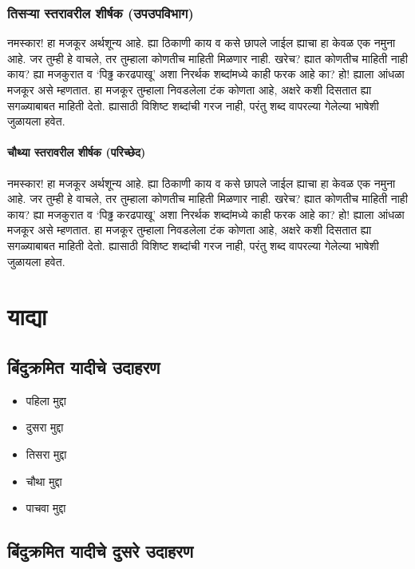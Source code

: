 \subsubsection{तिसऱ्या स्तरावरील शीर्षक (उपउपविभाग)}
नमस्कार! हा मजकूर अर्थशून्य आहे. ह्या ठिकाणी काय व कसे छापले जाईल ह्याचा हा केवळ एक नमुना
आहे. जर तुम्ही हे वाचले, तर तुम्हाला कोणतीच माहिती मिळणार नाही. खरेच? ह्यात कोणतीच माहिती
नाही काय? ह्या मजकुरात व `पिढ्ढ करढपाखू' अशा निरर्थक शब्दांमध्ये काही फरक आहे का? हो!
ह्याला आंधळा मजकूर असे म्हणतात. हा मजकूर तुम्हाला निवडलेला टंक कोणता आहे, अक्षरे कशी दिसतात
ह्या सगळ्याबाबत माहिती देतो. ह्यासाठी विशिष्ट शब्दांची गरज नाही, परंतु शब्द वापरल्या गेलेल्या
भाषेशी जुळायला हवेत.

\paragraph{चौथ्या स्तरावरील शीर्षक (परिच्छेद)}
नमस्कार! हा मजकूर अर्थशून्य आहे. ह्या ठिकाणी काय व कसे छापले जाईल ह्याचा हा केवळ एक नमुना
आहे. जर तुम्ही हे वाचले, तर तुम्हाला कोणतीच माहिती मिळणार नाही. खरेच? ह्यात कोणतीच माहिती
नाही काय? ह्या मजकुरात व `पिढ्ढ करढपाखू' अशा निरर्थक शब्दांमध्ये काही फरक आहे का? हो!
ह्याला आंधळा मजकूर असे म्हणतात. हा मजकूर तुम्हाला निवडलेला टंक कोणता आहे, अक्षरे कशी दिसतात
ह्या सगळ्याबाबत माहिती देतो. ह्यासाठी विशिष्ट शब्दांची गरज नाही, परंतु शब्द वापरल्या गेलेल्या
भाषेशी जुळायला हवेत.

\section{याद्या}

\subsection{बिंदुक्रमित यादीचे उदाहरण}

\begin{itemize}
\item पहिला मुद्दा
\item दुसरा मुद्दा
\item तिसरा मुद्दा
\item चौथा मुद्दा
\item पाचवा मुद्दा
\end{itemize}

\subsection*{बिंदुक्रमित यादीचे दुसरे उदाहरण}

